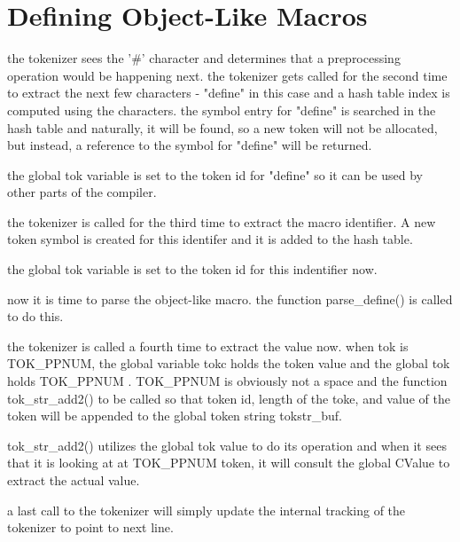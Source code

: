 \section{Defining Object-Like Macros}

the tokenizer sees the '\#' character and determines that a preprocessing operation would be happening next. the tokenizer gets called for the second time to extract the next few characters - "define" in this case and a hash table
index is computed using the characters. the symbol entry for "define" is searched in the hash table and naturally, it will be found, so a new token will not be allocated, but instead, a reference to the symbol for "define" will be returned.

the global tok variable is set to the token id for "define" so it can be used by other parts of the compiler.

the tokenizer is called for the third time to extract the macro identifier. A new token symbol is created for this identifer and it is added to the hash table.

the global tok variable is set to the token id for this indentifier now.

now it is time to parse the object-like macro. the function parse\_define() is called to do this.

the tokenizer is called a fourth time to extract the value now. when tok is TOK\_PPNUM, the global variable tokc holds the token value and the global tok holds TOK\_PPNUM . TOK\_PPNUM is obviously not a space and the function tok\_str\_add2() to be called so that token id, length of the toke, and value of the token will be appended to the global token string tokstr\_buf.

tok\_str\_add2() utilizes the global tok value to do its operation and when it sees that it is looking at at TOK\_PPNUM token, it will consult the global CValue to extract the actual value.

a last call to the tokenizer will simply update the internal tracking of the tokenizer to point to next line.







